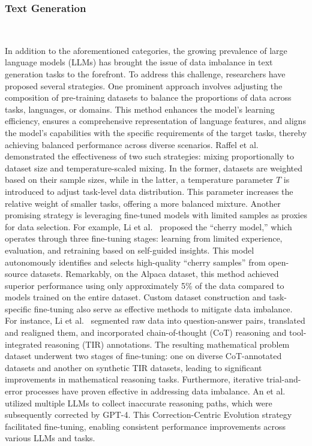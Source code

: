 
\subsubsection{Text Generation}\ 


In addition to the aforementioned categories, the growing prevalence of large language models (LLMs) has brought the issue of data imbalance in text generation tasks to the forefront. To address this challenge, researchers have proposed several strategies. One prominent approach involves adjusting the composition of pre-training datasets to balance the proportions of data across tasks, languages, or domains. This method enhances the model's learning efficiency, ensures a comprehensive representation of language features, and aligns the model's capabilities with the specific requirements of the target tasks, thereby achieving balanced performance across diverse scenarios. Raffel et al.~\cite{raffel2020exploring} demonstrated the effectiveness of two such strategies: mixing proportionally to dataset size and temperature-scaled mixing. In the former, datasets are weighted based on their sample sizes, while in the latter, a temperature parameter $T$ is introduced to adjust task-level data distribution. This parameter increases the relative weight of smaller tasks, offering a more balanced mixture. Another promising strategy is leveraging fine-tuned models with limited samples as proxies for data selection. For example, Li et al.~\cite{li2023from} proposed the ``cherry model,'' which operates through three fine-tuning stages: learning from limited experience, evaluation, and retraining based on self-guided insights. This model autonomously identifies and selects high-quality ``cherry samples'' from open-source datasets. Remarkably, on the Alpaca dataset, this method achieved superior performance using only approximately 5\% of the data compared to models trained on the entire dataset. Custom dataset construction and task-specific fine-tuning also serve as effective methods to mitigate data imbalance. For instance, Li et al.~\cite{li2024numinamath} segmented raw data into question-answer pairs, translated and realigned them, and incorporated chain-of-thought (CoT) reasoning and tool-integrated reasoning (TIR) annotations. The resulting mathematical problem dataset underwent two stages of fine-tuning: one on diverse CoT-annotated datasets and another on synthetic TIR datasets, leading to significant improvements in mathematical reasoning tasks. Furthermore, iterative trial-and-error processes have proven effective in addressing data imbalance. An et al.~\cite{an2023learning} utilized multiple LLMs to collect inaccurate reasoning paths, which were subsequently corrected by GPT-4. This Correction-Centric Evolution strategy facilitated fine-tuning, enabling consistent performance improvements across various LLMs and tasks.

